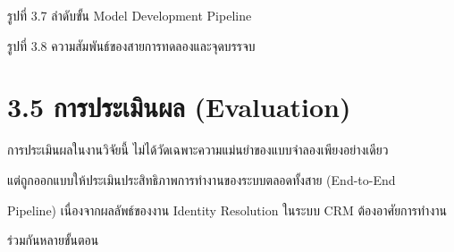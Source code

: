 \documentclass[12pt,a4paper]{report}
\begin{document}
\clearpage
\begin{center}\small รูปที่ 3.7 ลำดับขั้น Model Development Pipeline\end{center}
\begin{center}\small รูปที่ 3.8 ความสัมพันธ์ของสายการทดลองและจุดบรรจบ\end{center}
\clearpage
\section*{3.5 การประเมินผล (Evaluation)}
การประเมินผลในงานวิจัยนี้ ไม่ได้วัดเฉพาะความแม่นยำของแบบจำลองเพียงอย่างเดียว\par
แต่ถูกออกแบบให้ประเมินประสิทธิภาพการทำงานของระบบตลอดทั้งสาย (End-to-End\par
Pipeline) เนื่องจากผลลัพธ์ของงาน Identity Resolution ในระบบ CRM ต้องอาศัยการทำงาน\par
ร่วมกันหลายขั้นตอน\par
\end{document}
